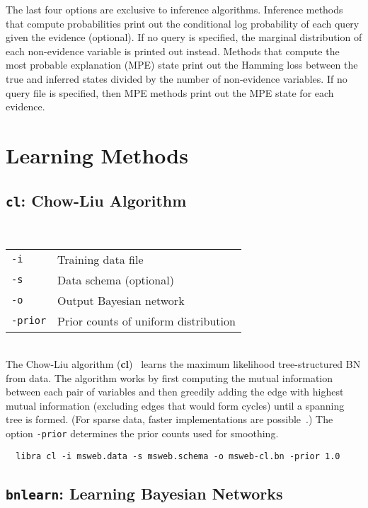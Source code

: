 \documentclass[11pt]{article}
\begin{document}
The last four options are exclusive to inference algorithms.
Inference methods that compute probabilities print out the
conditional log probability of each query given the evidence
(optional).  If no query is specified, the marginal distribution of
each non-evidence variable is printed out instead.  Methods that
compute the most probable explanation (MPE) state print out the
Hamming loss between the true and inferred states divided by the
number of non-evidence variables.  If no query file is specified, then
MPE methods print out the MPE state for each evidence.


\section{Learning Methods}

\subsection{{\tt cl}: Chow-Liu Algorithm} \label{sec:cl}

 \\
\begin{tabular}{ll}
  {\tt -i}    &  Training data file \\
  {\tt -s}    & Data schema (optional) \\
  {\tt -o}    & Output Bayesian network \\
  {\tt -prior}& Prior counts of uniform distribution
\end{tabular} \\

The Chow-Liu algorithm ({\bf cl})~\cite{chow&liu68} learns the maximum
likelihood tree-structured BN from data.  The algorithm works by first
computing the mutual information between each pair of variables and
then greedily adding the edge with highest mutual information
(excluding edges that would form cycles) until a spanning tree is
formed.  (For sparse data, faster implementations are
possible~\cite{meila99}.) The option {\tt -prior} determines the prior
counts used for smoothing.
\begin{verbatim}
  libra cl -i msweb.data -s msweb.schema -o msweb-cl.bn -prior 1.0
\end{verbatim}

\subsection{{\tt bnlearn}: Learning Bayesian Networks} \label{sec:bnlearn}
\end{document}
